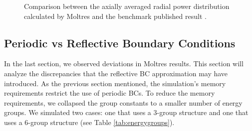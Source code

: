 \begin{figure}[htbp!]
	\centering
	\hfill
  \caption{Comparison between the axially averaged radial power distribution calculated by Moltres and the benchmark published result \cite{oecd_nea_coupled_2020}.}
  \label{fig:radialpower}
\end{figure}

\subsection{Periodic vs Reflective Boundary Conditions}
\label{sec:bench-bcs}

In the last section, we observed deviations in Moltres results.
This section will analyze the discrepancies that the reflective \gls{BC} approximation may have introduced.
As the previous section mentioned, the simulation's memory requirements restrict the use of periodic BCs.
To reduce the memory requirements, we collapsed the group constants to a smaller number of energy groups.
We simulated two cases: one that uses a 3-group structure and one that uses a 6-group structure (see Table \ref{tab:energygroups}).

